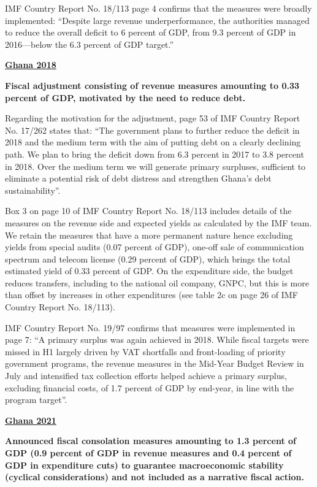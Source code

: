 IMF Country Report No. 18/113 page 4 confirms that the measures were broadly implemented: “Despite large revenue underperformance, the authorities managed to reduce the overall deficit to 6 percent of GDP, from 9.3 percent of GDP in 2016—below the 6.3 percent of GDP target.”

\textbf{\underline{Ghana 2018}}

\textbf{Fiscal adjustment consisting of revenue measures amounting to 0.33 percent of GDP, motivated by the need to reduce debt.} 

Regarding the motivation for the adjustment, page 53 of IMF Country Report No. 17/262 states that: “The government plans to further reduce the deficit in 2018 and the medium term with the aim of putting debt on a clearly declining path. We plan to bring the deficit down from 6.3 percent in 2017 to 3.8 percent in 2018. Over the medium term we will generate primary surpluses, sufficient to eliminate a potential risk of debt distress and strengthen Ghana’s debt sustainability”.

Box 3 on page 10 of IMF Country Report No. 18/113 includes details of the measures on the revenue side and expected yields as calculated by the IMF team. We retain the measures that have a more permanent nature hence excluding yields from special audits (0.07 percent of GDP), one-off sale of communication spectrum and telecom license (0.29 percent of GDP), which brings the total estimated yield of 0.33 percent of GDP. On the expenditure side, the budget reduces transfers, including to the national oil company, GNPC, but this is more than offset by increases in other expenditures (see table 2c on page 26 of IMF Country Report No. 18/113).

IMF Country Report No. 19/97 confirms that measures were implemented in page 7: “A primary surplus was again achieved in 2018. While fiscal targets were missed in H1 largely driven by VAT shortfalls and front-loading of priority government programs, the revenue measures in the Mid-Year Budget Review in July and intensified tax collection efforts helped achieve a primary surplus, excluding financial costs, of 1.7 percent of GDP by end-year, in line with the program target”. 

\textbf{\underline{Ghana 2021}}

\textbf{Announced fiscal consolation measures amounting to 1.3 percent of GDP (0.9 percent of GDP in revenue measures and 0.4 percent of GDP in expenditure cuts) to guarantee macroeconomic stability (cyclical considerations) and not included as a narrative fiscal action.}

